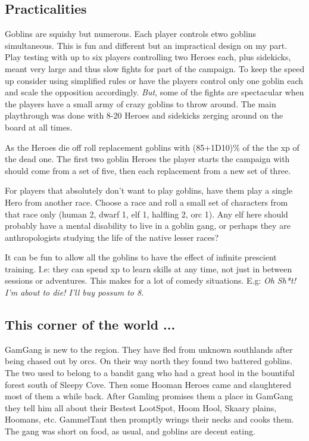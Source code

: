 \subsection*{Practicalities}

Goblins are squishy but numerous. Each player controls etwo goblins simultaneous. This is fun and different but an impractical design on my part. Play testing with up to six players controlling two Heroes each, plus sidekicks, meant very large and thus slow fights for part of the campaign. To keep the speed up consider using simplified rules or have the players control only one goblin each and scale the opposition accordingly. \emph{But}, some of the fights are spectacular when the players have a small army of crazy goblins to throw around. The main playthrough was done with 8-20 Heroes and sidekicks zerging around on the board at all times.

As the Heroes die off roll replacement goblins with (85+1D10)\% of the the xp of the dead one. The first two goblin Heroes the player starts the campaign with should come from a set of five, then each replacement from a new set of three.

For players that absolutely don't want to play goblins, have them play a single Hero from another race. Choose a race and roll a small set of characters from that race only (human 2, dwarf 1, elf 1, halfling 2, orc 1). Any elf here should probably have a mental disability to live in a goblin gang, or perhaps they are anthropologists studying the life of the native lesser races?

It can be fun to allow all the goblins to have the effect of infinite prescient training. I.e: they can spend xp to learn skills at any time, not just in between sessions or adventures. This makes for a lot of comedy situations. E.g: \emph{Oh Sh*t! I'm about to die! I'll buy possum to 8.}


\subsection*{This corner of the world ...}

GamGang is new to the region. They have fled from unknown southlands after being chased out by orcs. On their way north they found two battered goblins. The two used to belong to a bandit gang who had a great hool in the bountiful forest south of Sleepy Cove. Then some Hooman Heroes came and slaughtered most of them a while back. After Gamling promises them a place in GamGang they tell him all about their Bestest LootSpot, Hoom Hool, Skaary plains, Hoomans, etc. GammelTant then promptly wrings their necks and cooks them. The gang was short on food, as usual, and goblins are decent eating.

